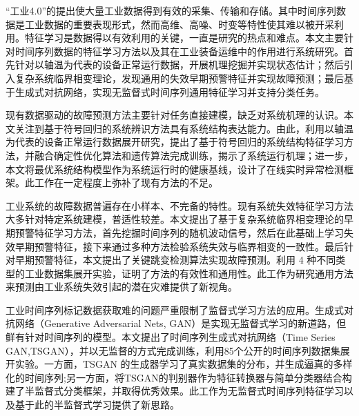 \begin{cabstract}
  
  “工业4.0”的提出使大量工业数据得到有效的采集、传输和存储。其中时间序列数据是工业数据的重要表现形式，然而高维、高噪、时变等特性使其难以被开采利用。特征学习是数据得以有效利用的关键，一直是研究的热点和难点。本文主要针对时间序列数据的特征学习方法以及其在工业装备运维中的作用进行系统研究。首先针对以轴温为代表的设备正常运行数据，开展机理挖掘并实现状态估计；然后引入复杂系统临界相变理论，发现通用的失效早期预警特征并实现故障预测；最后基于生成式对抗网络，实现无监督式时间序列通用特征学习并支持分类任务。

  现有数据驱动的故障预测方法主要针对任务直接建模，缺乏对系统机理的认识。本文关注到基于符号回归的系统辨识方法具有系统结构表达能力。由此，利用以轴温为代表的设备正常运行数据展开研究，提出了基于符号回归的系统结构特征学习方法，并融合确定性优化算法和遗传算法完成训练，揭示了系统运行机理；进一步，本文将最优系统结构模型作为系统运行时的健康基线，设计了在线实时异常检测框架。此工作在一定程度上弥补了现有方法的不足。

  工业系统的故障数据普遍存在小样本、不完备的特性。现有系统失效特征学习方法大多针对特定系统建模，普适性较差。本文提出了基于复杂系统临界相变理论的早期预警特征学习方法，首先挖掘时间序列的随机波动信号，然后在此基础上学习失效早期预警特征，接下来通过多种方法检验系统失效与临界相变的一致性。最后针对早期预警特征，本文提出了关键跳变检测算法实现故障预测。利用 4 种不同类型的工业数据集展开实验，证明了方法的有效性和通用性。此工作为研究通用方法来预测由工业系统失效引起的潜在灾难提供了新视角。

  工业时间序列标记数据获取难的问题严重限制了监督式学习方法的应用。生成式对抗网络（Generative Adversarial Nets, GAN）是实现无监督式学习的新道路，但鲜有针对时间序列的模型。本文提出了时间序列生成式对抗网络（Time Series GAN,TSGAN），并以无监督的方式完成训练，利用85个公开的时间序列数据集展开实验。一方面，TSGAN 的生成器学习了真实数据集的分布，并生成逼真的多样化的时间序列;另一方面，将TSGAN的判别器作为特征转换器与简单分类器结合构建了半监督式分类框架，并取得优秀效果。此工作为无监督式时间序列特征学习以及基于此的半监督式学习提供了新思路。


\end{cabstract}


